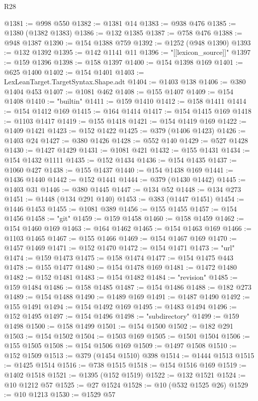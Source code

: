 \begin{lexlean}{R28}
\begin{coremodule}
@1381 := @998 @550
@1382 := @1381 @14
@1383 := @938 @476
@1385 := @1380 (@1382 @1383)
@1386 := @132 @1385
@1387 := @758 @476
@1388 := @948 @1387
@1390 := @154 @1388 @759
@1392 := @1252 (@948 @1390)
@1393 := @132 @1392
@1395 := @142 @1141 @11
@1396 := "[[lexicon_source]]"
@1397 := @159 @1396
@1398 := @158 @1397
@1400 := @154 @1398 @169
@1401 := @625 @1400
@1402 := @154 @1401
@1403 := LexLeanTarget.TargetSyntax.Shape.adt
@1404 := @1403 @138
@1406 := @380 @1404 @453
@1407 := @1081 @462
@1408 := @155 @1407
@1409 := @154 @1408
@1410 := "builtin"
@1411 := @159 @1410
@1412 := @158 @1411
@1414 := @154 @1412 @169
@1415 := @164 @1414
@1417 := @154 @1415 @169
@1418 := @1103 @1417
@1419 := @155 @1418
@1421 := @154 @1419 @169
@1422 := @1409 @1421
@1423 := @152 @1422
@1425 := @379 (@1406 @1423)
@1426 := @1403 @24
@1427 := @380 @1426
@1428 := @552 @140
@1429 := @527 @1428
@1430 := @1427 @1429
@1431 := @1081 @421
@1432 := @155 @1431
@1434 := @154 @1432 @1111
@1435 := @152 @1434
@1436 := @154 @1435
@1437 := @1060 @427
@1438 := @155 @1437
@1440 := @154 @1438 @169
@1441 := @1436 @1440
@1442 := @152 @1441
@1444 := @379 (@1430 @1442)
@1445 := @1403 @31
@1446 := @380 @1445
@1447 := @134 @52
@1448 := @134 @273
@1451 := @1448 (@134 @291 @140)
@1453 := @383 (@1447 @1451)
@1454 := @1446 @1453
@1455 := @1081 @389
@1456 := @155 @1455
@1457 := @154 @1456
@1458 := "git"
@1459 := @159 @1458
@1460 := @158 @1459
@1462 := @154 @1460 @169
@1463 := @164 @1462
@1465 := @154 @1463 @169
@1466 := @1103 @1465
@1467 := @155 @1466
@1469 := @154 @1467 @169
@1470 := @1457 @1469
@1471 := @152 @1470
@1472 := @154 @1471
@1473 := "url"
@1474 := @159 @1473
@1475 := @158 @1474
@1477 := @154 @1475 @443
@1478 := @155 @1477
@1480 := @154 @1478 @169
@1481 := @1472 @1480
@1482 := @152 @1481
@1483 := @154 @1482
@1484 := "revision"
@1485 := @159 @1484
@1486 := @158 @1485
@1487 := @154 @1486
@1488 := @182 @273
@1489 := @154 @1488
@1490 := @1489 @169
@1491 := @1487 @1490
@1492 := @155 @1491
@1494 := @154 @1492 @169
@1495 := @1483 @1494
@1496 := @152 @1495
@1497 := @154 @1496
@1498 := "subdirectory"
@1499 := @159 @1498
@1500 := @158 @1499
@1501 := @154 @1500
@1502 := @182 @291
@1503 := @154 @1502
@1504 := @1503 @169
@1505 := @1501 @1504
@1506 := @155 @1505
@1508 := @154 @1506 @169
@1509 := @1497 @1508
@1510 := @152 @1509
@1513 := @379 (@1454 @1510) @398
@1514 := @1444 @1513
@1515 := @1425 @1514
@1516 := @738 @1515
@1518 := @154 @1516 @169
@1519 := @1402 @1518
@1521 := @1395 (@152 @1519)
@1522 := @132 @1521
@1524 := @10 @1212 @57
@1525 := @27 @1524
@1528 := @10 (@532 @1525 @26)
@1529 := @10 @1213
@1530 := @1529 @57

\end{coremodule}
\end{lexlean}
